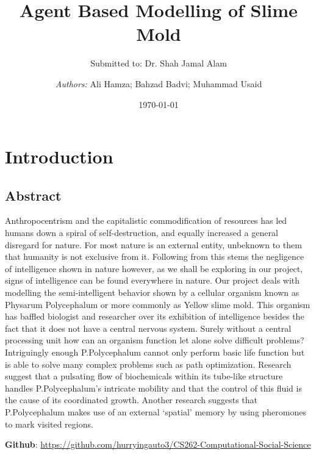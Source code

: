 \documentclass[a4paper, 12pt]{article}
\institute{\huge{Habib University}}
\title{Agent Based Modelling of Slime Mold}
\subtitle{Submitted to: Dr. Shah Jamal Alam}
\author{\Large{\textit{Authors:} Ali Hamza; Bahzad Badvi; Muhammad Usaid}}
\date{\today}
\begin{document}
\maketitle
\newpage
\tableofcontents
\newpage
\section{Introduction}
\subsection{Abstract}
Anthropocentrism and the capitalistic commodification of resources has led humans down a spiral of self-destruction, and equally increased a general disregard for nature. For most nature is an external entity, unbeknown to them that humanity is not exclusive from it. Following from this stems the negligence of intelligence shown in nature however, as we shall be exploring in our project, signs of intelligence can be found everywhere in nature. Our project deals with modelling the semi-intelligent behavior shown by a cellular organism known as Physarum Polycephalum or more commonly as Yellow slime mold. This organism has baffled biologist and researcher over its exhibition of intelligence besides the fact that it does not have a central nervous system. Surely without a central processing unit how can an organism function let alone solve difficult problems? Intriguingly enough P.Polycephalum cannot only perform basic life function but is able to solve many complex problems such as path optimization. Research suggest that a pulsating flow of biochemicals within its tube-like structure handles P.Polycephalum’s intricate mobility and that the control of this fluid is the cause of its coordinated growth. Another research suggests that P.Polycephalum makes use of an external ‘spatial’ memory by using pheromones to mark visited regions.\par 
\textbf{Github}: \url{https://github.com/hurryingauto3/CS262-Computational-Social-Science}

\end{document}
